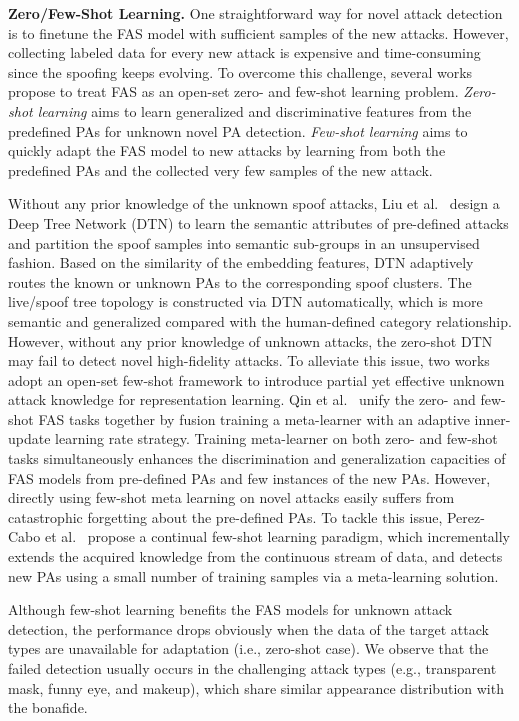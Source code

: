 \documentclass[10pt,journal,compsoc]{IEEEtran}
\begin{document}
\vspace{0.4em}
\noindent\textbf{Zero/Few-Shot Learning.}\quad   
One straightforward way for novel attack detection is to finetune the FAS model with sufficient samples of the new attacks. However, collecting labeled data for every new attack is expensive and time-consuming since the spoofing keeps evolving. To overcome this challenge, several works~\cite{liu2019deep,qin2019learning,perez2020learning} propose to treat FAS as an open-set zero- and few-shot learning problem. \textit{Zero-shot learning} aims to learn generalized and discriminative features from the predefined PAs for unknown novel PA detection. \textit{Few-shot learning} aims to quickly adapt the FAS model to new attacks by learning from both the predefined PAs and the collected very few samples of the new attack. 


Without any prior knowledge of the unknown spoof attacks, Liu et al.~\cite{liu2019deep} design a Deep Tree Network (DTN) to learn the semantic attributes of pre-defined attacks and partition the spoof samples into semantic sub-groups in an unsupervised fashion. Based on the similarity of the embedding features, DTN adaptively routes the known or unknown PAs to the corresponding spoof clusters. The live/spoof tree topology is constructed via DTN automatically, which is more semantic and generalized compared with the human-defined category relationship. However, without any prior knowledge of unknown attacks, the zero-shot DTN may fail to detect novel high-fidelity attacks. To alleviate this issue, two works adopt an open-set few-shot framework to introduce partial yet effective unknown attack knowledge for representation learning. Qin et al.~\cite{qin2019learning} unify the zero- and few-shot FAS tasks together by fusion training a meta-learner with an adaptive inner-update learning rate strategy. Training meta-learner on both zero- and few-shot tasks simultaneously enhances the discrimination and generalization capacities of FAS models from pre-defined PAs and few instances of the new PAs. However, directly using few-shot meta learning on novel attacks easily suffers from catastrophic forgetting about the pre-defined PAs. To tackle this issue, Perez-Cabo et al.~\cite{perez2020learning} propose a continual few-shot learning paradigm, which incrementally extends the acquired knowledge from the continuous stream of data, and detects new PAs using a small number of training samples via a meta-learning solution.


Although few-shot learning benefits the FAS models for unknown attack detection, the performance drops obviously when the data of the target attack types are unavailable for adaptation (i.e., zero-shot case). We observe that the failed detection usually occurs in the challenging attack types (e.g., transparent mask, funny eye, and makeup), which share similar appearance distribution with the bonafide. 
\end{document}
